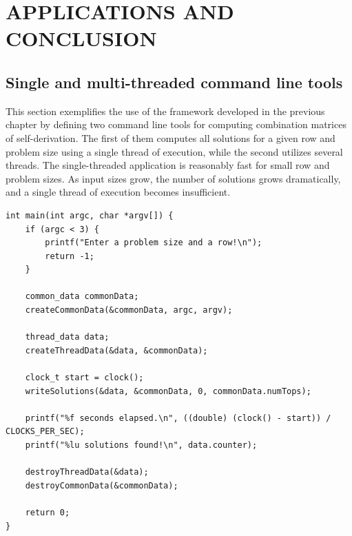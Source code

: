 \chapter{APPLICATIONS AND CONCLUSION}


\section{Single and multi-threaded command line tools}

This section exemplifies the use of the framework developed in the previous chapter by defining two command line tools for computing combination matrices of self-derivation. The first of them computes all solutions for a given row and problem size using a single thread of execution, while the second utilizes several threads. The single-threaded application is reasonably fast for small row and problem sizes. As input sizes grow, the number of solutions grows dramatically, and a single thread of execution becomes insufficient.

\begin{lstlisting}[caption={A single-threaded command line tool.},label={singleMain}]
int main(int argc, char *argv[]) {
    if (argc < 3) {
        printf("Enter a problem size and a row!\n");
        return -1;
    }

    common_data commonData;
    createCommonData(&commonData, argc, argv);

    thread_data data;
    createThreadData(&data, &commonData);

    clock_t start = clock();
    writeSolutions(&data, &commonData, 0, commonData.numTops);

    printf("%f seconds elapsed.\n", ((double) (clock() - start)) / CLOCKS_PER_SEC);
    printf("%lu solutions found!\n", data.counter);

    destroyThreadData(&data);
    destroyCommonData(&commonData);

    return 0;
}
\end{lstlisting}

